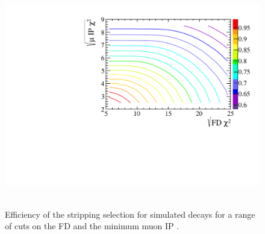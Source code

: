 \begin{figure}
    \centering
        \includegraphics[width=\textwidth]{./Figs/Selection/Bs2MuMu_efficiency_chart_Feb3_contours.pdf}
    ~ %
    \caption{Efficiency of the \bmumu stripping selection for \bsmumu simulated decays for a range of cuts on the \bs FD \chisqd and the minimum muon IP \chisqd.}
    \label{fig:efficiencyplots}
\end{figure}


